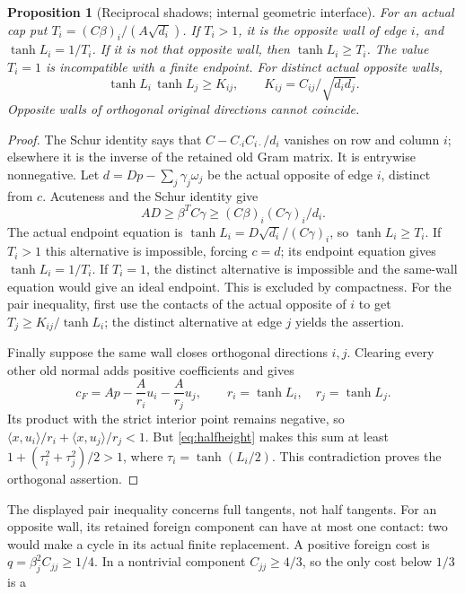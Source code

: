 \documentclass[11pt]{article}
\newtheorem{proposition}[theorem]{Proposition}
\theoremstyle{definition}
\theoremstyle{remark}
\newcommand{\ip}[2]{\langle #1,#2\rangle}
\begin{document}
\begin{proposition}[Reciprocal shadows; internal geometric interface]
\label{prop:shadows}
For an actual cap put \(T_i=(C\beta)_i/(A\sqrt{d_i})\).
If \(T_i>1\), it is the opposite wall of edge \(i\), and
\(\tanh L_i=1/T_i\). If it is not that opposite wall, then
\(\tanh L_i\geq T_i\). The value \(T_i=1\) is incompatible
with a finite endpoint. For distinct actual opposite walls,
\begin{equation}\label{eq:pair-shadow}
 \tanh L_i\,\tanh L_j\geq
 K_{ij},\qquad K_{ij}=C_{ij}/\sqrt{d_i d_j}.
\end{equation}
Opposite walls of orthogonal original directions cannot coincide.
\end{proposition}
\begin{proof}
The Schur identity says that
\(C-C_{\cdot i}C_{i\cdot}/d_i\) vanishes on row and column \(i\);
elsewhere it is the inverse of the retained old Gram matrix.
It is entrywise nonnegative. Let \(d=Dp-\sum_j\gamma_j\omega_j\)
be the actual opposite of edge \(i\), distinct from \(c\).
Acuteness and the Schur identity give
\[
 AD\geq\beta^TC\gamma
 \geq(C\beta)_i(C\gamma)_i/d_i.
\]
The actual endpoint equation is
\(\tanh L_i=D\sqrt{d_i}/(C\gamma)_i\), so
\(\tanh L_i\geq T_i\). If \(T_i>1\) this alternative is
impossible, forcing \(c=d\); its endpoint equation gives
\(\tanh L_i=1/T_i\).
If \(T_i=1\), the distinct alternative is impossible and the
same-wall equation would give an ideal endpoint. This is
excluded by compactness.
For the pair inequality, first use the contacts of the actual
opposite of \(i\) to get \(T_j\geq K_{ij}/\tanh L_i\);
the distinct alternative at edge \(j\) yields the assertion.

Finally suppose the same wall closes orthogonal directions
\(i,j\). Clearing every other old normal adds positive
coefficients and gives
\[
 c_F=A p-\frac{A}{r_i}u_i-\frac{A}{r_j}u_j,\qquad
 r_i=\tanh L_i,\quad r_j=\tanh L_j.
\]
Its product with the strict interior point remains negative,
so \(\ip{x}{u_i}/r_i+\ip{x}{u_j}/r_j<1\).
But \eqref{eq:halfheight} makes this sum at least
\(1+(\tau_i^2+\tau_j^2)/2>1\),
where \(\tau_i=\tanh(L_i/2)\). This contradiction proves
the orthogonal assertion.
\end{proof}
The displayed pair inequality concerns full tangents, not
half tangents.
For an opposite wall, its retained foreign component can have
at most one contact: two would make a cycle in its actual
finite replacement. A positive foreign cost is
\(q=\beta_j^2C_{jj}\geq1/4\). In a nontrivial component
\(C_{jj}\geq4/3\), so the only cost below \(1/3\) is a
\end{document}
